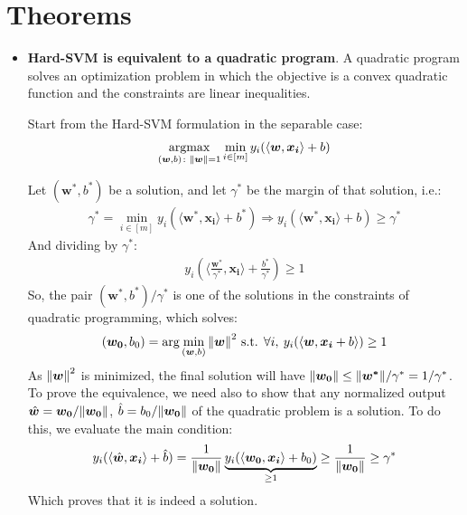 \documentclass[../template.tex]{subfiles}
\begin{document}
\section{Theorems}
\begin{itemize}
    \item \textbf{Hard-SVM is equivalent to a quadratic program}. A quadratic program solves an optimization problem in which the objective is a convex quadratic function and the constraints are linear inequalities.

    Start from the Hard-SVM formulation in the separable case:
    \begin{align*}
        \underset{(\bm{w},b)\colon \norm{\bm{w}}=1}{\operatorname{argmax}}  \min_{i \in [m]} y_i (\langle \bm{w}, \bm{x_i} \rangle + b)
    \end{align*}

    Let $(\bm{w^*}, b^*)$ be a solution, and let $\gamma^*$ be the margin of that solution, i.e.:
    \begin{align*}
        \gamma^* = \min_{i \in [m]} y_i (\langle \bm{w^*}, \bm{x_i} \rangle +b^*) \Rightarrow y_i(\langle \bm{w^*}, \bm{x_i} \rangle + b) \geq \gamma^* 
    \end{align*}
    And dividing by $\gamma^*$:
    \begin{align*}
        y_i \left(\langle \frac{\bm{w^*}}{\gamma^*}, \bm{x_i}  \rangle +\frac{b^*}{\gamma^*}\right) \geq1 
    \end{align*} 
    So, the pair $(\bm{w^*}, b^*)/\gamma^*$ is one of the solutions in the constraints of quadratic programming, which solves:
    \begin{align*}
        (\bm{w_0}, b_0) = \arg\min_{(\bm{w},b)} \norm{\bm{w}}^2 \text{ s.t. } \forall i, \> y_i (\langle \bm{w}, \bm{x_i} + b \rangle) \geq 1 
    \end{align*} 
    As $\norm{\bm{w}}^2$ is minimized, the final solution will have $\norm{\bm{w_0}} \leq \norm{\bm{w^*}}/\gamma^* = 1/\gamma^*$.\\
    
    To prove the equivalence, we need also to show that any normalized output $\hat{\bm{w}} = \bm{w_0}/\norm{\bm{w_0}}$, $\hat{b} = b_0/\norm{\bm{w_0}}$ of the quadratic problem is a solution. To do this, we evaluate the main condition:
    \begin{align*}
        y_i (\langle \hat{\bm{w}}, \bm{x_i} \rangle+ \hat{b}) = \frac{1}{\norm{\bm{w_0}}} \underbrace{y_i (\langle \bm{w_0}, \bm{x_i} \rangle + b_0)}_{\geq 1}  \geq \frac{1}{\norm{\bm{w_0}}} \geq \gamma^*
    \end{align*}
    Which proves that it is indeed a solution.


\end{itemize}
\end{document}
